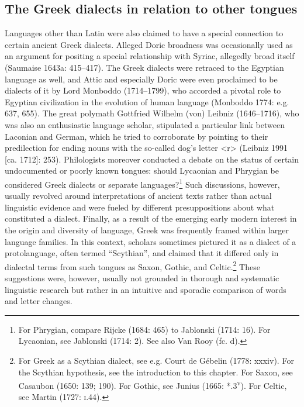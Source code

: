 \subsection{The Greek dialects in relation to other tongues}
\hypertarget{Toc19704841}{}\begin{styleStandard}
Languages other than Latin were also claimed to have a special connection to certain ancient Greek dialects. Alleged Doric broadness was occasionally used as an argument for positing a special relationship with Syriac, allegedly broad itself (Saumaise 1643a: 415–417). The Greek dialects were retraced to the Egyptian language as well, and Attic and especially Doric were even proclaimed to be dialects of it by Lord Monboddo (1714–1799), who accorded a pivotal role to Egyptian civilization in the evolution of human language (Monboddo 1774: e.g. 637, 655). The great polymath Gottfried Wilhelm (von) Leibniz (1646–1716), who was also an enthusiastic language scholar, stipulated a particular link between Laconian and German, which he tried to corroborate by pointing to their predilection for ending nouns with the so-called dog’s letter {\textless}r{\textgreater} (Leibniz 1991 [ca. 1712]: 253). Philologists moreover conducted a debate on the status of certain undocumented or poorly known tongues: should Lycaonian and Phrygian be considered Greek dialects or separate languages?\footnote{ For Phrygian, compare Rijcke (1684: 465) to Jablonski (1714: 16). For Lycaonian, see Jablonski (1714: 2). See also Van Rooy (fc. d).} Such discussions, however, usually revolved around interpretations of ancient texts rather than actual linguistic evidence and were fueled by different presuppositions about what constituted a dialect. Finally, as a result of the emerging early modern interest in the origin and diversity of language, Greek was frequently framed within larger language families. In this context, scholars sometimes pictured it as a dialect of a protolanguage, often termed “Scythian”, and claimed that it differed only in dialectal terms from such tongues as Saxon, Gothic, and Celtic.\footnote{ For Greek as a Scythian dialect, see e.g. Court de Gébelin (1778: xxxiv). For the Scythian hypothesis, see the introduction to this chapter. For Saxon, see Casaubon (1650: 139; 190). For Gothic, see Junius (1665: *.3\textsc{\textsuperscript{v}}). For Celtic, see Martin (1727: \textsc{i}.44).} These suggestions were, however, usually not grounded in thorough and systematic linguistic research but rather in an intuitive and sporadic comparison of words and letter changes.
\end{styleStandard}

